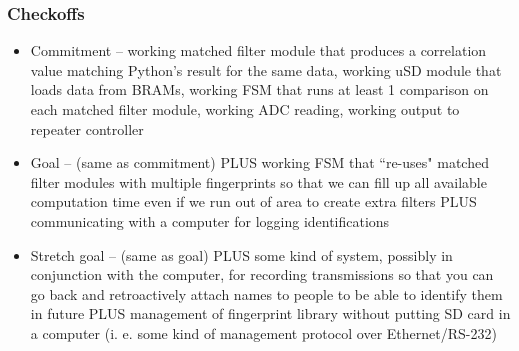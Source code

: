 \documentclass{beamer}
\begin{document}
    \begin{frame}
        \frametitle{Checkoffs}

        \begin{itemize}
            \item Commitment -- working matched filter module that produces a correlation value matching Python's result for the same data, working uSD module that loads data from BRAMs, working FSM that runs at least 1 comparison on each matched filter module, working ADC reading, working output to repeater controller
            \item Goal -- (same as commitment) PLUS working FSM that ``re-uses" matched filter modules with multiple fingerprints so that we can fill up all available computation time even if we run out of area to create extra filters PLUS communicating with a computer for logging identifications
            \item Stretch goal -- (same as goal) PLUS some kind of system, possibly in conjunction with the computer, for recording transmissions so that you can go back and retroactively attach names to people to be able to identify them in future PLUS management of fingerprint library without putting SD card in a computer (i. e. some kind of management protocol over Ethernet/RS-232)
        \end{itemize}
    \end{frame}
\end{document}
